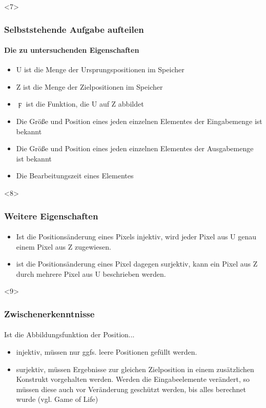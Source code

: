 \documentclass{beamer}
\begin{document}
\begin{frame}<7>
  \frametitle{Selbststehende Aufgabe aufteilen}
  \framesubtitle{Die zu untersuchenden Eigenschaften}

  \begin{itemize}
    \item U ist die Menge der Ursprungspositionen im Speicher
    \item Z ist die Menge der Zielpositionen im Speicher
    \item $\digamma$ ist die Funktion, die U auf Z abbildet
  \end{itemize}

  \begin{itemize}
    \item Die Größe und Position eines jeden einzelnen Elementes der Eingabemenge ist bekannt
    \item Die Größe und Position eines jeden einzelnen Elementes der Ausgabemenge ist bekannt
    \item Die Bearbeitungszeit eines Elementes
  \end{itemize}

\end{frame}

\begin{frame}<8>
  \frametitle{Weitere Eigenschaften}
  \framesubtitle{}
  
  \begin{itemize}
    \item Ist die Positionsänderung eines Pixels injektiv, wird jeder Pixel aus U genau einem Pixel aus Z zugewiesen.
    \item ist die Positionsänderung eines Pixel dagegen surjektiv, kann ein Pixel aus Z durch mehrere Pixel aus U beschrieben werden.
  \end{itemize}
  
\end{frame}

\begin{frame}<9>
  \frametitle{Zwischenerkenntnisse}
  \framesubtitle{}
    
  \begin{center}
    Ist die Abbildungsfunktion der Position...
  \end{center}
  
  \begin{itemize}
    \item  injektiv, müssen nur ggfs. leere Positionen gefüllt werden.
    \item  surjektiv, müssen Ergebnisse zur gleichen Zielposition in einem zusätzlichen Konstrukt vorgehalten werden. Werden die Eingabeelemente verändert, so müssen diese auch vor Veränderung geschützt werden, bis alles berechnet wurde (vgl. Game of Life)
  \end{itemize}

  
\end{frame}
\end{document}
